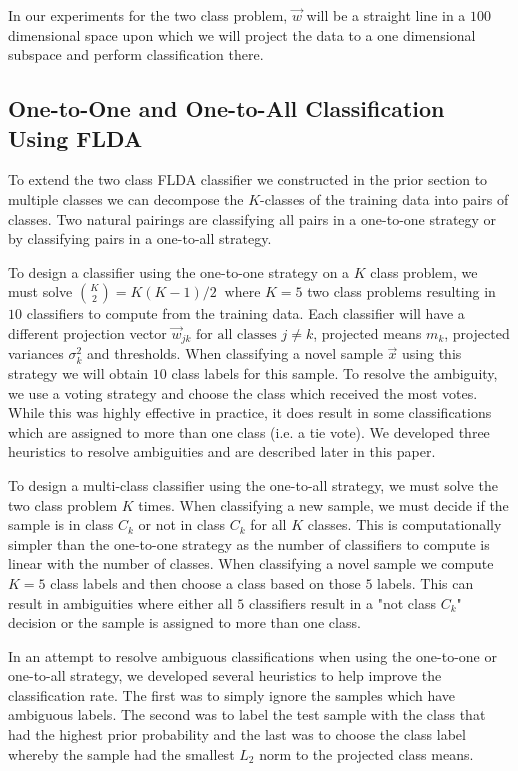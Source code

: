 \documentclass[journal]{IEEEtran}
\begin{document}
In our experiments for the two class problem, \(\vec{w}\) will be a straight line in a \(100\) dimensional space upon which we will project the data to a one dimensional subspace and perform classification there.

\subsection{One-to-One and One-to-All Classification Using FLDA}
\par To extend the two class FLDA classifier we constructed in the prior section to multiple classes we can decompose the \(K\)-classes of the training data into pairs of classes. Two natural pairings are classifying all pairs in a one-to-one strategy or by classifying pairs in a one-to-all strategy.
\par To design a classifier using the one-to-one strategy on a \(K\) class problem, we must solve \(K \choose 2\)\( = K(K-1)/2\ \text{  where  } K = 5\) two class problems resulting in \(10\) classifiers to compute from the training data. Each classifier will have a different projection vector \(\vec{w}_{jk} \text{ for all classes } j \ne k\), projected means \(m_k\), projected variances \(\sigma_k^2\) and thresholds. When classifying a novel sample \(\vec{x}\) using this strategy we will obtain \(10\) class labels for this sample. To resolve the ambiguity, we use a voting strategy and choose the class which received the most votes. While this was highly effective in practice, it does result in some classifications which are assigned to more than one class (i.e. a tie vote). We developed three heuristics to resolve ambiguities and are described later in this paper.
\par To design a multi-class classifier using the one-to-all strategy, we must solve the two class problem \(K\) times. When classifying a new sample, we  must decide if the sample is in class \(C_k\) or not in class \(C_k\) for all \(K\) classes. This is computationally simpler than the one-to-one strategy as the number of classifiers to compute is linear with the number of classes. When classifying a novel sample we compute \(K = 5\) class labels and then choose a class based on those \(5\) labels. This can result in ambiguities where either all \(5\) classifiers result in a "not class \(C_k\)" decision or the sample is assigned to more than one class.
\par In an attempt to resolve ambiguous classifications when using the one-to-one or one-to-all strategy, we developed several heuristics to help improve the classification rate. The first was to simply ignore the samples which have ambiguous labels. The second was to label the test sample with the class that had the highest prior probability and the last was to choose the class label whereby the sample had the smallest \(L_2\) norm to the projected class means.
\end{document}
